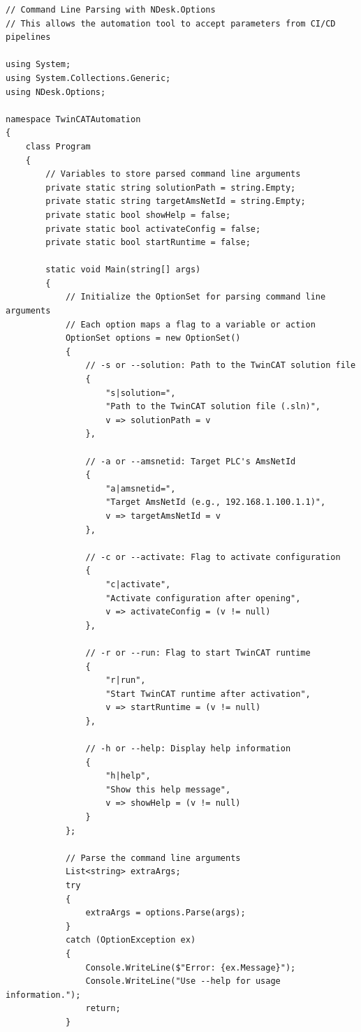 \documentclass[11pt,a4paper]{article}
\begin{document}
\begin{lstlisting}[style=csharpstyle]
// Command Line Parsing with NDesk.Options
// This allows the automation tool to accept parameters from CI/CD pipelines

using System;
using System.Collections.Generic;
using NDesk.Options;

namespace TwinCATAutomation
{
    class Program
    {
        // Variables to store parsed command line arguments
        private static string solutionPath = string.Empty;
        private static string targetAmsNetId = string.Empty;
        private static bool showHelp = false;
        private static bool activateConfig = false;
        private static bool startRuntime = false;
        
        static void Main(string[] args)
        {
            // Initialize the OptionSet for parsing command line arguments
            // Each option maps a flag to a variable or action
            OptionSet options = new OptionSet()
            {
                // -s or --solution: Path to the TwinCAT solution file
                {
                    "s|solution=",
                    "Path to the TwinCAT solution file (.sln)",
                    v => solutionPath = v
                },
                
                // -a or --amsnetid: Target PLC's AmsNetId
                {
                    "a|amsnetid=",
                    "Target AmsNetId (e.g., 192.168.1.100.1.1)",
                    v => targetAmsNetId = v
                },
                
                // -c or --activate: Flag to activate configuration
                {
                    "c|activate",
                    "Activate configuration after opening",
                    v => activateConfig = (v != null)
                },
                
                // -r or --run: Flag to start TwinCAT runtime
                {
                    "r|run",
                    "Start TwinCAT runtime after activation",
                    v => startRuntime = (v != null)
                },
                
                // -h or --help: Display help information
                {
                    "h|help",
                    "Show this help message",
                    v => showHelp = (v != null)
                }
            };
            
            // Parse the command line arguments
            List<string> extraArgs;
            try
            {
                extraArgs = options.Parse(args);
            }
            catch (OptionException ex)
            {
                Console.WriteLine($"Error: {ex.Message}");
                Console.WriteLine("Use --help for usage information.");
                return;
            }
            

\end{lstlisting}
\end{document}
